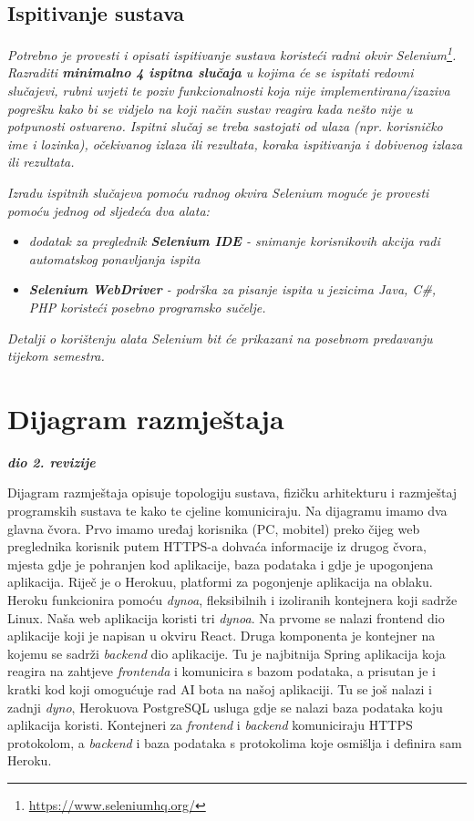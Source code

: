 			
			
			\subsection{Ispitivanje sustava}
			
			 \textit{Potrebno je provesti i opisati ispitivanje sustava koristeći radni okvir Selenium\footnote{\url{https://www.seleniumhq.org/}}. Razraditi \textbf{minimalno 4 ispitna slučaja} u kojima će se ispitati redovni slučajevi, rubni uvjeti te poziv funkcionalnosti koja nije implementirana/izaziva pogrešku kako bi se vidjelo na koji način sustav reagira kada nešto nije u potpunosti ostvareno. Ispitni slučaj se treba sastojati od ulaza (npr. korisničko ime i lozinka), očekivanog izlaza ili rezultata, koraka ispitivanja i dobivenog izlaza ili rezultata.\\ }
			 
			 \textit{Izradu ispitnih slučajeva pomoću radnog okvira Selenium moguće je provesti pomoću jednog od sljedeća dva alata:}
			 \begin{itemize}
			 	\item \textit{dodatak za preglednik \textbf{Selenium IDE} - snimanje korisnikovih akcija radi automatskog ponavljanja ispita	}
			 	\item \textit{\textbf{Selenium WebDriver} - podrška za pisanje ispita u jezicima Java, C\#, PHP koristeći posebno programsko sučelje.}
			 \end{itemize}
		 	\textit{Detalji o korištenju alata Selenium bit će prikazani na posebnom predavanju tijekom semestra.}
			
			\eject 
		
		
		\section{Dijagram razmještaja}
			
			\textbf{\textit{dio 2. revizije}}
			
			Dijagram razmještaja opisuje topologiju sustava, fizičku arhitekturu i razmještaj programskih sustava te kako te cjeline komuniciraju. Na dijagramu imamo dva glavna čvora. Prvo imamo uređaj korisnika (PC, mobitel) preko čijeg web preglednika korisnik putem HTTPS-a dohvaća informacije iz drugog čvora, mjesta gdje je pohranjen kod aplikacije, baza podataka i gdje je upogonjena aplikacija. Riječ je o Herokuu, platformi za pogonjenje aplikacija na oblaku. Heroku funkcionira pomoću \textit{dynoa}, fleksibilnih i izoliranih kontejnera koji sadrže Linux. Naša web aplikacija koristi tri \textit{dynoa}. Na prvome se nalazi frontend dio aplikacije koji je napisan u okviru React. Druga komponenta je kontejner na kojemu se sadrži \textit{backend} dio aplikacije. Tu je najbitnija Spring aplikacija koja reagira na zahtjeve \textit{frontenda} i komunicira s bazom podataka, a prisutan je i kratki kod koji omogućuje rad AI bota na našoj aplikaciji. Tu se još nalazi i zadnji \textit{dyno}, Herokuova PostgreSQL usluga gdje se nalazi baza podataka koju aplikacija koristi. Kontejneri za \textit{frontend} i \textit{backend} komuniciraju HTTPS protokolom, a \textit{backend} i baza podataka s protokolima koje osmišlja i definira sam Heroku.

